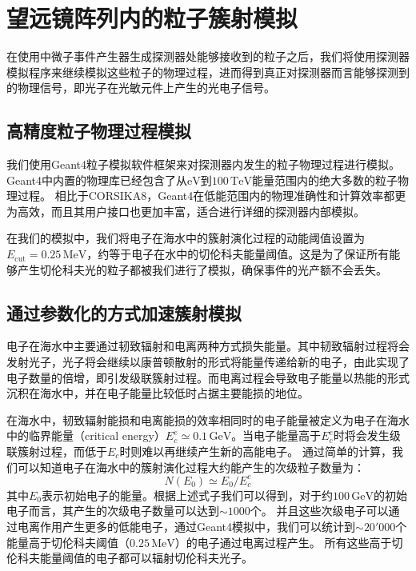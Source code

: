 \section{望远镜阵列内的粒子簇射模拟}
\label{sec:shower_simulation}

在使用中微子事件产生器生成探测器处能够接收到的粒子之后，我们将使用探测器模拟程序来继续模拟这些粒子的物理过程，进而得到真正对探测器而言能够探测到的物理信号，即光子在光敏元件上产生的光电子信号。

\subsection{高精度粒子物理过程模拟}

我们使用\textsf{Geant4}粒子模拟软件框架\cite{GEANT4:2003,GEANT4:2006}来对探测器内发生的粒子物理过程进行模拟。
\textsf{Geant4}中内置的物理库已经包含了从$\mathrm{eV}$到$100\,\mathrm{TeV}$能量范围内的绝大多数的粒子物理过程。
相比于\textsf{CORSIKA8}，\textsf{Geant4}在低能范围内的物理准确性和计算效率都更为高效，而且其用户接口也更加丰富，适合进行详细的探测器内部模拟。

在我们的模拟中，我们将电子在海水中的簇射演化过程的动能阈值设置为$E_\mathrm{cut} = 0.25\,\mathrm{MeV}$，约等于电子在水中的切伦科夫能量阈值。这是为了保证所有能够产生切伦科夫光的粒子都被我们进行了模拟，确保事件的光产额不会丢失。


\subsection{通过参数化的方式加速簇射模拟}

电子在海水中主要通过韧致辐射和电离两种方式损失能量。其中韧致辐射过程将会发射光子，光子将会继续以康普顿散射的形式将能量传递给新的电子，由此实现了电子数量的倍增，即引发级联簇射过程。而电离过程会导致电子能量以热能的形式沉积在海水中，并在电子能量比较低时占据主要能损的地位。

在海水中，韧致辐射能损和电离能损的效率相同时的电子能量被定义为电子在海水中的临界能量（critical energy）\cite{PROPOSAL:2013}$E_c^e \simeq 0.1 \,\mathrm{GeV}$。当电子能量高于$E_c^e$时将会发生级联簇射过程，而低于$E_c$时则难以再继续产生新的高能电子。
通过简单的计算，我们可以知道电子在海水中的簇射演化过程大约能产生的次级粒子数量为：
\begin{equation}
    N(E_0) \simeq E_0 / E_c^e
    \label{eq:param_flow_chart}
\end{equation}
其中$E_0$表示初始电子的能量。根据上述式子我们可以得到，对于约$100\,\mathrm{GeV}$的初始电子而言，其产生的次级电子数量可以达到$\sim 1000$个。
并且这些次级电子可以通过电离作用产生更多的低能电子，通过Geant4模拟中，我们可以统计到$\sim 20'000$个能量高于切伦科夫阈值（$0.25\,\mathrm{MeV}$）的电子通过电离过程产生。
所有这些高于切伦科夫能量阈值的电子都可以辐射切伦科夫光子。

